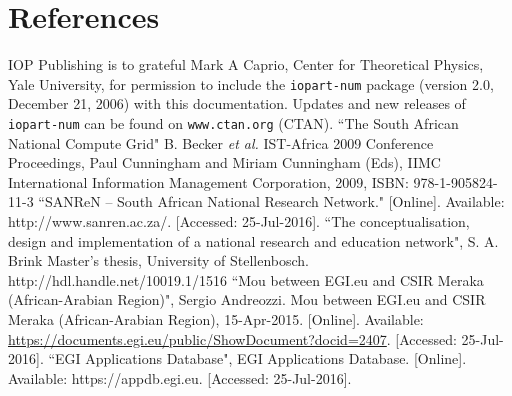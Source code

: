 \documentclass[a4paper]{jpconf}
\begin{document}
\section*{References}
\begin{thebibliography}{9}
 IOP Publishing is to grateful Mark A Caprio, Center for Theoretical Physics, Yale University, for permission to include the {\tt iopart-num} \BibTeX package (version 2.0, December 21, 2006) with  this documentation. Updates and new releases of {\tt iopart-num} can be found on \verb"www.ctan.org" (CTAN).
  ``The South African National Compute Grid" B. Becker {\it et al.} IST-Africa 2009 Conference Proceedings, Paul Cunningham and Miriam Cunningham (Eds), IIMC International Information Management Corporation, 2009, ISBN: 978-1-905824-11-3
 ``SANReN – South African National Research Network." [Online]. Available: http://www.sanren.ac.za/. [Accessed: 25-Jul-2016].
 ``The conceptualisation, design and implementation of a national research and education network", S. A. Brink Master's thesis, University of Stellenbosch. http://hdl.handle.net/10019.1/1516
 ``Mou between EGI.eu and CSIR Meraka (African-Arabian Region)", Sergio Andreozzi. Mou between EGI.eu and CSIR Meraka (African-Arabian Region), 15-Apr-2015. [Online]. Available: \url{https://documents.egi.eu/public/ShowDocument?docid=2407}. [Accessed: 25-Jul-2016].
 ``EGI Applications Database", EGI Applications Database. [Online]. Available: https://appdb.egi.eu. [Accessed: 25-Jul-2016].

\end{thebibliography}

% 
\end{document}
